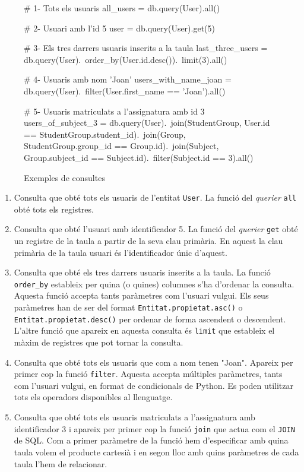 \begin{figure}
  	\begin{python}
# 1- Tots els usuaris
all_users = db.query(User).all()

# 2- Usuari amb l'id 5
user = db.query(User).get(5)

# 3- Els tres darrers usuaris inserits a la taula 
last_three_users = db.query(User).\
				order_by(User.id.desc()).\
				limit(3).all()

# 4- Usuaris amb nom 'Joan'
users_with_name_joan = db.query(User).\
				filter(User.first_name == 'Joan').all()
											
# 5- Usuaris matriculats a l'assignatura amb id 3
users_of_subject_3 = db.query(User).\
				join(StudentGroup, User.id == StudentGroup.student_id).\
				join(Group, StudentGroup.group_id == Group.id).\
				join(Subject, Group.subject_id == Subject.id).\
				filter(Subject.id == 3).all()
				
	\end{python}
	\caption{Exemples de consultes}
	\label{fig:exemples_consultes}
\end{figure}

	\begin{enumerate}
		\item Consulta que obté tots els usuaris de l'entitat \texttt{User}. La funció del \emph{querier} \texttt{all} obté tots els registres.
		
		\item Consulta que obté l'usuari amb identificador 5. La funció del \emph{querier} \texttt{get} obté un registre de la taula a partir de la seva clau primària. En aquest la clau primària de la taula usuari és l'identificador únic d'aquest.
		
		\item Consulta que obté els tres darrers usuaris inserits a la taula. La funció \texttt{order\_by} estableix per quina (o quines) columnes s'ha d'ordenar la consulta. Aquesta funció accepta tants paràmetres com l'usuari vulgui. Els seus paràmetres han de ser del format \texttt{Entitat.propietat.asc()} o \texttt{Entitat.propietat.desc()} per ordenar de forma ascendent o descendent. L'altre funció que apareix en aquesta consulta és \texttt{limit} que estableix el màxim de registres que pot tornar la consulta.
		
		\item Consulta que obté tots els usuaris que com a nom tenen "Joan". Apareix per primer cop la funció \texttt{filter}. Aquesta accepta múltiples paràmetres, tants com l'usuari vulgui, en format de condicionals de Python. Es poden utilitzar tots els operadors disponibles al llenguatge.
		
		\item Consulta que obté tots els usuaris matriculats a l'assignatura amb identificador 3 i apareix per primer cop la funció \texttt{join} que actua com el \texttt{JOIN} de \ac{SQL}. Com a primer paràmetre de la funció hem d'especificar amb quina taula volem el producte cartesià i en segon lloc amb quins paràmetres de cada taula l'hem de relacionar.
		
	\end{enumerate}
	
